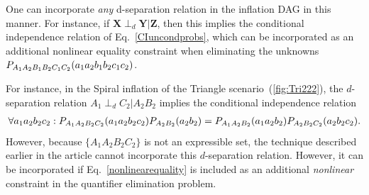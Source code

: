 \documentclass[aps,english,10pt,superscriptaddress,onecolumn,twoside,longbibliography,pra,floatfix,fleqn,nofootinbib]{revtex4-1}%
\theoremstyle{definition}
\newcounter{example}[section]
\newcommand{\p}[2][]{{P_{#1}}\parenths{#2}}
\newcommand{\aindep}{\ensuremath{\perp_d}} %
\DeclarePairedDelimiter{\parenths}{\lparen}{\rparen}
\begin{document}
One can incorporate {\em any} d-separation relation in the inflation DAG in this manner.  For instance, if ${\bm X} \perp_d {\bm Y}| {\bm Z}$, then this implies the conditional independence relation of Eq.~\eqref{CIuncondprobs}, which can be incorporated as an additional nonlinear equality constraint when eliminating the unknowns $\p[A_1 A_2 B_1 B_2 C_1 C_2]{a_1 a_2 b_1 b_2 c_1 c_2}$.

For instance, in the Spiral inflation of the Triangle scenario~(\cref{fig:Tri222}), the $d$-separation relation $A_1\aindep C_2|A_2 B_2$ implies the conditional independence relation
\begin{align}\label{nonlinearequality}
\forall{a_1 a_2 b_2 c_2}: \p[A_1 A_2 B_2 C_2]{a_1 a_2 b_2 c_2}\p[A_2 B_2]{a_2 b_2}=\p[A_1 A_2 B_2]{a_1 a_2 b_2}\p[A_2 B_2 C_2]{a_2 b_2 c_2}.
\end{align}
However, because $\{ A_1 A_2 B_2 C_2\}$ is not an expressible set, the technique described earlier in the article cannot incorporate this $d$-separation relation.  However, it can be incorporated if Eq.~\eqref{nonlinearequality} is included as an additional {\em nonlinear} constraint in the quantifier elimination problem.  
\color{black}


\end{document}
